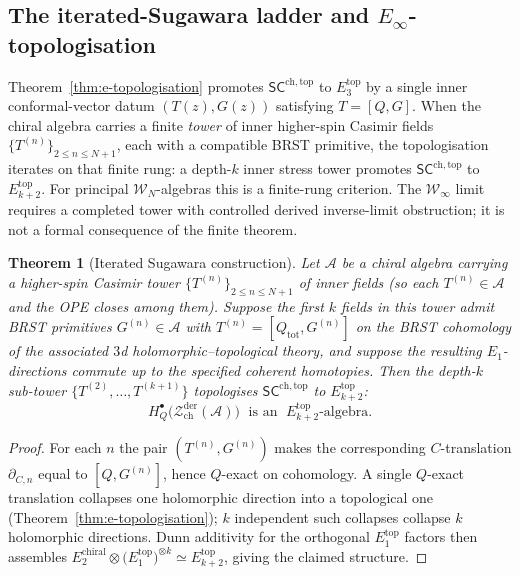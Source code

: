 \documentclass[11pt,reqno]{amsart}
\newtheorem{theorem}{Theorem}[section]
\theoremstyle{definition}
\theoremstyle{remark}
\providecommand{\cA}{\mathcal{A}}
\providecommand{\cW}{\mathcal{W}}
\providecommand{\cZ}{\mathcal{Z}}
\providecommand{\Ethree}{E_3}
\providecommand{\Einf}{E_\infty}
\providecommand{\SCchtop}{\ensuremath{\mathsf{SC}^{\mathrm{ch,top}}}}
\begin{document}
\subsection{The iterated-Sugawara ladder and
$\Einf$-topologisation}
\label{subsec:iterated-sugawara-ladder}

Theorem~\textup{\ref{thm:e-topologisation}} promotes
$\SCchtop$ to $\Ethree^{\mathrm{top}}$ by a single inner
conformal-vector datum $(T(z),G(z))$ satisfying
$T = [Q, G]$. When the chiral algebra carries a finite \emph{tower}
of inner higher-spin Casimir fields
$\{T^{(n)}\}_{2 \leq n \leq N+1}$, each with a compatible BRST
primitive, the topologisation iterates on that finite rung: a
depth-$k$ inner stress tower promotes $\SCchtop$ to
$E_{k+2}^{\mathrm{top}}$. For principal $\cW_N$-algebras this is a
finite-rung criterion. The $\cW_\infty$ limit requires a completed
tower with controlled derived inverse-limit obstruction; it is not a
formal consequence of the finite theorem.

\begin{theorem}[Iterated Sugawara construction]
\label{thm:iterated-sugawara-standalone}
Let $\cA$ be a chiral algebra carrying a higher-spin Casimir
tower $\{T^{(n)}\}_{2 \leq n \leq N+1}$ of inner fields
\textup{(}so each $T^{(n)} \in \cA$ and the OPE closes among
them\textup{)}. Suppose the first \(k\) fields in this tower admit
BRST primitives
$G^{(n)} \in \cA$ with
$T^{(n)} = [Q_{\mathrm{tot}}, G^{(n)}]$ on the BRST cohomology
of the associated \(3\)d holomorphic--topological theory, and suppose
the resulting \(E_1\)-directions commute up to the specified coherent
homotopies. Then the depth-$k$ sub-tower $\{T^{(2)}, \ldots,
T^{(k+1)}\}$ topologises $\SCchtop$ to $E_{k+2}^{\mathrm{top}}$:
\[
H_Q^\bullet\bigl(\cZ^{\mathrm{der}}_{\mathrm{ch}}(\cA)\bigr)
 \;\text{ is an }\;
E_{k+2}^{\mathrm{top}}\text{-algebra.}
\]
\end{theorem}

\begin{proof}
For each $n$ the pair $(T^{(n)}, G^{(n)})$ makes the
corresponding $C$-translation $\partial_{C,n}$ equal to
$[Q, G^{(n)}]$, hence $Q$-exact on cohomology. A single
$Q$-exact translation collapses one holomorphic direction into
a topological one (Theorem~\ref{thm:e-topologisation}); $k$
independent such collapses collapse $k$ holomorphic directions.
Dunn additivity for the orthogonal $E_1^{\mathrm{top}}$ factors
then assembles
$E_2^{\mathrm{chiral}} \otimes
 \bigl(E_1^{\mathrm{top}}\bigr)^{\otimes k}
 \simeq E_{k+2}^{\mathrm{top}}$,
giving the claimed structure.
\end{proof}
\end{document}
